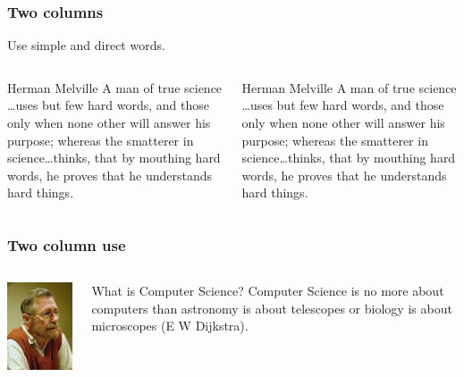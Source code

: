 \documentclass[11pt]{beamer}
\begin{document}
\begin{frame}
  \frametitle{Two columns}
  Use simple and direct words.
  \begin{columns}
    \begin{column}{.45\textwidth}
      \begin{block}{Herman Melville}
        A man of true science \ldots uses but few hard words,
        and those only when none other will answer his purpose;
        whereas the smatterer in science\ldots thinks, that by
        mouthing hard words, he proves that he understands hard
        things.
      \end{block}
    \end{column}
    \begin{column}{.45\textwidth}
      \begin{alertblock}{Herman Melville}
        A man of true science \ldots uses but few hard words,
        and those only when none other will answer his purpose;
        whereas the smatterer in science\ldots thinks, that by
        mouthing hard words, he proves that he understands hard
        things.
      \end{alertblock}
    \end{column}
  \end{columns}
\end{frame}

\begin{frame}
  \frametitle{Two column use}
  \begin{columns}
    \begin{column}{.4\textwidth}
    \begin{center}
      \includegraphics[scale=.5]{dijkstra.jpeg}
    \end{center}      
    \end{column}
    \begin{column}{.5\textwidth}
      \begin{exampleblock}{What is Computer Science?}
        Computer Science is no more about computers than
        astronomy is about telescopes or biology is about
        microscopes (E W Dijkstra).
      \end{exampleblock}
    \end{column}
  \end{columns}
\end{frame}
\end{document}
